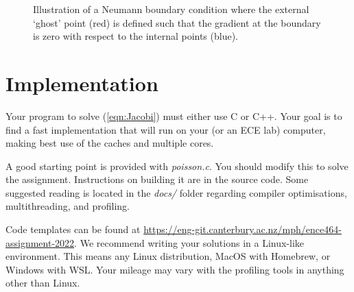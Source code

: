 \documentclass[a4paper,11pt]{article}
\begin{document}
\begin{figure}
  \centering
  \caption{Illustration of a Neumann boundary condition where the external
  `ghost' point (red) is defined such that the gradient at the boundary is zero
  with respect to the internal points (blue).}
  \label{fig:Boundary}
\end{figure}


\section{Implementation}

Your program to solve (\ref{eqn:Jacobi}) must either use C or C++.  Your
goal is to find a fast implementation that will run on your (or an ECE
lab) computer, making best use of the caches and multiple cores.

A good starting point is provided with \emph{poisson.c}. You should modify this
to solve the assignment. Instructions on building it are in the source code.
Some suggested reading is located in the \emph{docs/} folder regarding compiler
optimisations, multithreading, and profiling.



Code templates can be found at
\url{https://eng-git.canterbury.ac.nz/mph/ence464-assignment-2022}. We
recommend writing your solutions in a Linux-like environment. This
means any Linux distribution, MacOS with Homebrew, or Windows with
WSL. Your mileage may vary with the profiling tools in anything other
than Linux.
\end{document}
